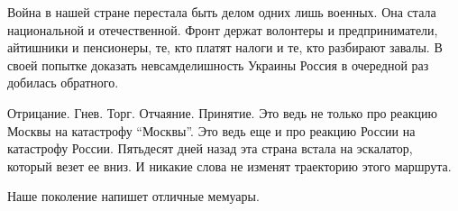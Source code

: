 Война в нашей стране перестала быть делом одних лишь военных. Она стала
национальной и отечественной. Фронт держат волонтеры и предприниматели,
айтишники и пенсионеры, те, кто платят налоги и те, кто разбирают завалы. В
своей попытке доказать невсамделишность Украины Россия в очередной раз добилась
обратного.

Отрицание. Гнев. Торг. Отчаяние. Принятие. Это ведь не только про реакцию
Москвы на катастрофу \enquote{Москвы}. Это ведь еще и про реакцию России на катастрофу
России. Пятьдесят дней назад эта страна встала на эскалатор, который везет ее
вниз. И никакие слова не изменят траекторию этого маршрута.

Наше поколение напишет отличные мемуары.
